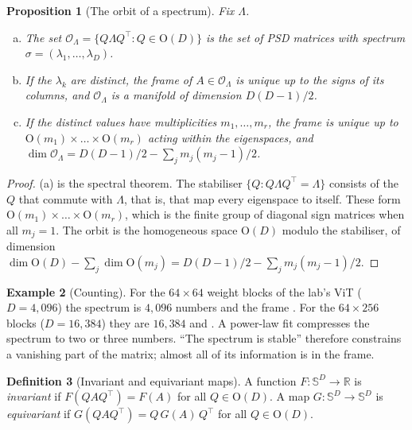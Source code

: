 \documentclass[11pt,a4paper]{article}
\newcommand{\R}{\mathbb{R}}
\newcommand{\Orth}{\mathrm{O}}
\newcommand{\Sym}{\mathbb{S}}
\theoremstyle{plain}
\newtheorem{proposition}{Proposition}[section]
\theoremstyle{definition}
\newtheorem{definition}[proposition]{Definition}
\newtheorem{example}[proposition]{Example}
\theoremstyle{remark}
\begin{document}
\begin{proposition}[The orbit of a spectrum]\label{prop:orbit}
Fix $\Lambda$.
\begin{enumerate}[(a)]
\item The set $\mathcal{O}_\Lambda=\{Q\Lambda Q^\top: Q\in\Orth(D)\}$ is the set of PSD matrices with spectrum
  $\sigma=(\lambda_1,\dots,\lambda_D)$.
\item If the $\lambda_k$ are distinct, the frame of $A\in\mathcal{O}_\Lambda$ is unique up to the signs of its columns,
  and $\mathcal{O}_\Lambda$ is a manifold of dimension $D(D-1)/2$.
\item If the distinct values have multiplicities $m_1,\dots,m_r$, the frame is unique up to
  $\Orth(m_1)\times\dots\times\Orth(m_r)$ acting within the eigenspaces, and
  $\dim\mathcal{O}_\Lambda=D(D-1)/2-\sum_j m_j(m_j-1)/2$.
\end{enumerate}
\end{proposition}
\begin{proof}
(a) is the spectral theorem. The stabiliser $\{Q: Q\Lambda Q^\top=\Lambda\}$ consists of the $Q$ that commute with
$\Lambda$, that is, that map every eigenspace to itself. These form $\Orth(m_1)\times\dots\times\Orth(m_r)$, which is
the finite group of diagonal sign matrices when all $m_j=1$. The orbit is the homogeneous space $\Orth(D)$ modulo
the stabiliser, of dimension $\dim\Orth(D)-\sum_j\dim\Orth(m_j)=D(D-1)/2-\sum_j m_j(m_j-1)/2$.
\end{proof}

\begin{example}[Counting]\label{ex:count}
For the $64\times64$ weight blocks of the lab's ViT ($D=4{,}096$) the spectrum is $4{,}096$ numbers and the frame
\NumFrameParamsFourK. For the $64\times256$ blocks ($D=16{,}384$) they are $16{,}384$ and \NumFrameParamsSixteenK. A
power-law fit compresses the spectrum to two or three numbers. ``The spectrum is stable'' therefore constrains a
vanishing part of the matrix; almost all of its information is in the frame.
\end{example}

\begin{definition}[Invariant and equivariant maps]
A function $F:\Sym^D\to\R$ is \emph{invariant} if $F(QAQ^\top)=F(A)$ for all $Q\in\Orth(D)$. A map
$G:\Sym^D\to\Sym^D$ is \emph{equivariant} if $G(QAQ^\top)=Q\,G(A)\,Q^\top$ for all $Q\in\Orth(D)$.
\end{definition}
\end{document}
